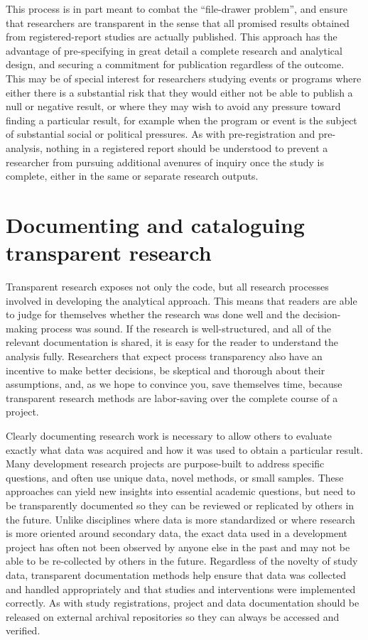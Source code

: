 This process is in part meant to combat the ``file-drawer problem'',\cite{simonsohn2014p}
and ensure that researchers are transparent in the sense that
all promised results obtained from registered-report studies are actually published.
This approach has the advantage of pre-specifying in great detail
a complete research and analytical design,
and securing a commitment for publication regardless of the outcome.
This may be of special interest for researchers
studying events or programs where either there is a substantial risk
that they would either not be able to publish a null or negative result,
or where they may wish to avoid any pressure toward finding a particular result,
for example when the program or event is the subject of substantial social or political pressures.
As with pre-registration and pre-analysis,
nothing in a registered report should be understood
to prevent a researcher from pursuing additional avenures of inquiry
once the study is complete, either in the same or separate research outputs.

\section{Documenting and cataloguing transparent research}
Transparent research exposes not only the code,
but all research processes involved in developing the analytical approach.\cite{christensen2019transparent}
This means that readers are able to judge for themselves whether the research was done well
and the decision-making process was sound.
If the research is well-structured, and all of the relevant documentation
is shared, it is easy for the reader to understand the analysis fully.
Researchers that expect process transparency also have an incentive to make better decisions,
be skeptical and thorough about their assumptions,
and, as we hope to convince you, save themselves time,
because transparent research methods are labor-saving over the complete course of a project.

Clearly documenting research work is necessary
to allow others to evaluate exactly what data was acquired and how it was used
to obtain a particular result.
Many development research projects are purpose-built
to address specific questions,
and often use unique data, novel methods, or small samples.
These approaches can yield new insights into essential academic questions,
but need to be transparently documented so they can be reviewed
or replicated by others in the future.\cite{duvendack2017meant}
Unlike disciplines where data is more standardized
or where research is more oriented around secondary data,
 the exact data used in a development project
has often not been observed by anyone else in the past
and may not be able to be re-collected by others in the future.
Regardless of the novelty of study data,
transparent documentation methods help ensure
that data was collected and handled appropriately
and that studies and interventions were implemented correctly.
As with study registrations, project and data documentation
should be released on external archival repositories
so they can always be accessed and verified.

